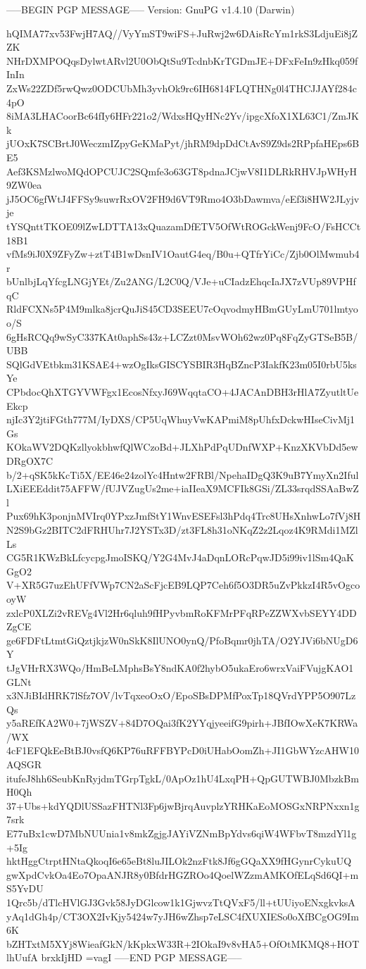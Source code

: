 -----BEGIN PGP MESSAGE-----
Version: GnuPG v1.4.10 (Darwin)

hQIMA77xv53FwjH7AQ//VyYmST9wiFS+JuRwj2w6DAisRcYm1rkS3LdjuEi8jZZK
NHrDXMPOQqsDylwtARvl2U0ObQtSu9TcdnbKrTGDmJE+DFxFeIn9zHkq059fInIn
ZxWs22ZDf5rwQwz0ODCUbMh3yvhOk9rc6IH6814FLQTHNg0l4THCJJAYf284c4pO
8iMA3LHACoorBc64fIy6HFr221o2/WdxsHQyHNc2Yv/ipgcXfoX1XL63C1/ZmJKk
jUOxK7SCBrtJ0WeczmIZpyGeKMaPyt/jhRM9dpDdCtAvS9Z9ds2RPpfaHEps6BE5
Aef3KSMzlwoMQdOPCUJC2SQmfe3o63GT8pdnaJCjwV8I1DLRkRHVJpWHyH9ZW0ea
jJ5OC6gfWtJ4FFSy9suwrRxOV2FH9d6VT9Rmo4O3bDawmva/eEf3i8HW2JLyjvje
tYSQnttTKOE09lZwLDTTA13xQuazamDfETV5OfWtROGckWenj9FcO/FsHCCt18B1
vfMs9iJ0X9ZFyZw+ztT4B1wDsnIV1OautG4eq/B0u+QTfrYiCc/Zjb0OlMwmub4r
bUnlbjLqYfcgLNGjYEt/Zu2ANG/L2C0Q/VJe+uCIadzEhqcIaJX7zVUp89VPHfqC
RldFCXNs5P4M9mlka8jcrQuJiS45CD3SEEU7cOqvodmyHBmGUyLmU701lmtyoo/S
6gHsRCQq9wSyC337KAt0aphSs43z+LCZzt0MsvWOh62wz0Pq8FqZyGTSeB5B/UBB
SQlGdVEtbkm31KSAE4+wzOgIksGISCYSBIR3HqBZncP3IakfK23m05I0rbU5ksYe
CPbdocQhXTGYVWFgx1EcosNfxyJ69WqqtaCO+4JACAnDBH3rHlA7ZyutltUeEkcp
njIc3Y2jtiFGth777M/IyDXS/CP5UqWhuyVwKAPmiM8pUhfxDckwHIseCivMj1Gs
KOkaWV2DQKzllyokbhwfQlWCzoBd+JLXhPdPqUDnfWXP+KnzXKVbDd5ewDRgOX7C
b/2+qSK5kKcTi5X/EE46e24zolYc4Hntw2FRBl/NpehaIDgQ3K9uB7YmyXn2Iful
LXiEEEddit75AFFW/fUJVZugUs2me+iaIIeaX9MCFIk8GSi/ZL33srqdSSAaBwZl
Pux69hK3ponjnMVIrq0YPxzJmfStY1WnvESEFsl3hPdq4Trc8UHsXnhwLo7fVj8H
N2S9bGz2BITC2dFRHUhr7J2YSTx3D/zt3FL8h31oNKqZ2z2Lqoz4K9RMdi1MZlLs
CG5R1KWzBkLfcycpgJmoISKQ/Y2G4MvJ4aDqnLORcPqwJD5i99iv1lSm4QaKGgO2
V+XR5G7uzEhUFfVWp7CN2aScFjcEB9LQP7Ceh6f5O3DR5uZvPkkzI4R5vOgcooyW
zxlcP0XLZi2vREVg4Vl2Hr6qluh9fHPyvbmRoKFMrPFqRPeZZWXvbSEYY4DDZgCE
ge6FDFtLtmtGiQztjkjzW0nSkK8IlUNO0ynQ/PfoBqmr0jhTA/O2YJVi6bNUgD6Y
tJgVHrRX3WQo/HmBeLMphsBsY8ndKA0f2hybO5ukaEro6wrxVaiFVujgKAO1GLNt
x3NJiBIdHRK7lSfz7OV/lvTqxeoOxO/EpoSBsDPMfPoxTp18QVrdYPP5O907LzQs
y5aREfKA2W0+7jWSZV+84D7OQai3fK2YYqjyeeifG9pirh+JBfIOwXeK7KRWa/WX
4cF1EFQkEeBtBJ0vsfQ6KP76uRFFBYPcD0iUHabOomZh+JI1GbWYzcAHW10AQSGR
itufeJ8hh6SeubKnRyjdmTGrpTgkL/0ApOz1hU4LxqPH+QpGUTWBJ0MbzkBmH0Qh
37+Ubs+kdYQDlUSSazFHTNl3Fp6jwBjrqAuvplzYRHKaEoMOSGxNRPNxxn1g7srk
E77uBx1cwD7MbNUUnia1v8mkZgjgJAYiVZNmBpYdvs6qiW4WFbvT8mzdYl1g+5Ig
hktHggCtrptHNtaQkoqI6e65eBt8luJILOk2nzFtk8Jf6gGQaXX9fHGynrCykuUQ
gwXpdCvkOa4Eo7OpaANJR8y0BfdrHGZROo4QoelWZzmAMKOfELqSd6QI+mS5YvDU
1Qrc5b/dTlcHVlGJ3Gvk58JyDGlcow1k1GjwvzTtQVxF5/ll+tUUiyoENxgkvksA
yAq1dGh4p/CT3OX2IvKjy5424w7yJH6wZhsp7eLSC4fXUXIESo0oXfBCgOG9Im6K
bZHTxtM5XYj8WieafGkN/kKpkxW33R+2IOkaI9v8vHA5+OfOtMKMQ8+HOTlhUufA
brxkIjHD
=vagI
-----END PGP MESSAGE-----
